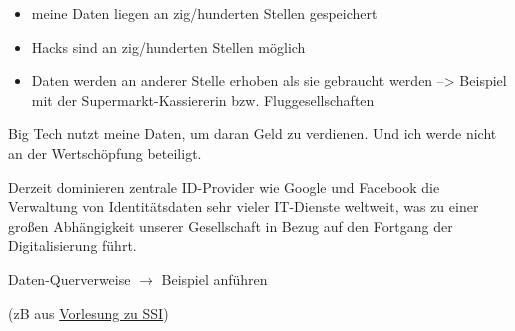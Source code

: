 \vspace{0.3cm}



\begin{Problem}[Datenschutz]

\begin{itemize}
  \item meine Daten liegen an zig/hunderten Stellen gespeichert
  \item Hacks sind an zig/hunderten Stellen möglich
\end{itemize}

\end{Problem}

\vspace{0.3cm}



\begin{Problem}

\begin{itemize}
  \item Daten werden an anderer Stelle erhoben als sie gebraucht werden --> Beispiel mit der Supermarkt-Kassiererin bzw. Fluggesellschaften
\end{itemize}

\end{Problem}

\vspace{0.3cm}


\begin{Problem}

Big Tech nutzt meine Daten, um daran Geld zu verdienen. Und ich werde nicht an der Wertschöpfung beteiligt.

\end{Problem}

\vspace{0.3cm}


\begin{Problem}

Derzeit dominieren zentrale ID-Provider wie Google und Facebook die Verwaltung von Identitätsdaten sehr vieler IT-Dienste weltweit, was zu einer großen Abhängigkeit unserer Gesellschaft in Bezug auf den Fortgang der Digitalisierung führt.

\end{Problem}

\vspace{0.3cm}


\begin{Problem}

Daten-Querverweise $\rightarrow$ Beispiel anführen 

(zB aus \href{https://norbert-pohlmann.com/glossar-cyber-sicherheit/self-sovereign-identity-ssi/}{Vorlesung zu SSI})

\end{Problem}

\vspace{0.5cm}
